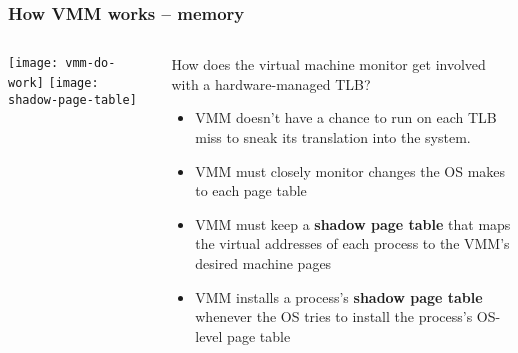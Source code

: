 \begin{frame}[plain]
	\frametitle{How VMM works -- memory}
	
	
	
	\begin{columns}
		
		\begin{column}{.4\textwidth}
			\centering
			\texttt{[image: vmm-do-work]}
			\texttt{[image: shadow-page-table]}
		\end{column}
		
		\begin{column}{.6\textwidth}
			
			How does the virtual machine monitor get involved with a
			hardware-managed TLB?	
			
			\begin{itemize}
				\item VMM doesn't have a chance to run on each TLB miss to sneak its translation into the system. 
				\item VMM must closely monitor changes	the OS makes to each page table
				\item VMM must keep a \textbf{shadow page table} that maps the virtual addresses of each process to the VMM's desired machine pages
				\item VMM installs a process's \textbf{shadow page table }whenever the OS tries to install the process's	OS-level page table
				
			\end{itemize} 
			
			
			
		\end{column}
		
		
	\end{columns}
	
	
\end{frame}


